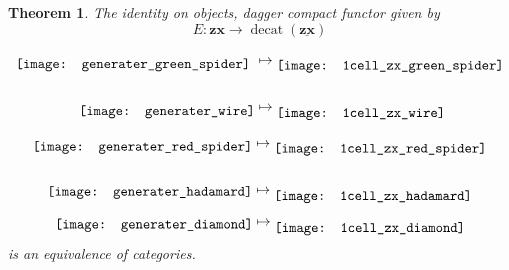 \documentclass[11pt]{amsart}
\newcommand{\cat}[1]{\mathbf{#1}}
\newcommand{\from}{\colon}
\newtheorem{thm}{Theorem}[section]
\theoremstyle{remark}
\theoremstyle{definition}
\newcommand{\bicat}[1]{\underline{\mathbf{#1}}}
\begin{document}
\begin{thm}
\label{thm:equiv of zx cats}
	The identity on objects, dagger compact functor given by
	\[
		E \from \cat{zx} \to \operatorname{decat}(\bicat{zx})
	\]
	\begin{minipage}{0.5\textwidth}
	\begin{align*}
	\raisebox{-0.4\height}{\texttt{[image: generater\_green\_spider]} }
		& \mapsto
		\raisebox{-0.55\height}{\texttt{[image: 1cell\_zx\_green\_spider]}} \\
	& \\
	\raisebox{-0.45\height}{\texttt{[image: generater\_wire]}}
		& \mapsto
		\raisebox{-0.65\height}{\texttt{[image: 1cell\_zx\_wire]}}
	\end{align*}
	\end{minipage}
	\begin{minipage}{0.5\textwidth}
		\begin{align*}
		\raisebox{-0.35\height}{\texttt{[image: generater\_red\_spider]}}
			& \mapsto
			\raisebox{-0.55\height}{\texttt{[image: 1cell\_zx\_red\_spider]}} \\
		& \\
		\raisebox{-0.2\height}{\texttt{[image: generater\_hadamard]}}
			& \mapsto
			\raisebox{-0.65\height}{\texttt{[image: 1cell\_zx\_hadamard]}}
		\end{align*}
	\end{minipage}
	\[
	\raisebox{-0.3\height}{\texttt{[image: generater\_diamond]}}
	\mapsto
	\raisebox{-0.65\height}{\texttt{[image: 1cell\_zx\_diamond]}}
	\]
	is an equivalence of categories.
\end{thm}
\end{document}
